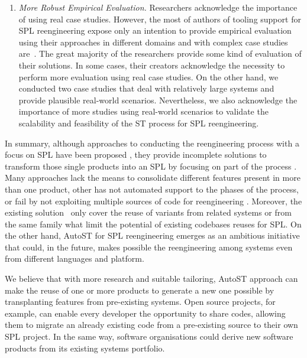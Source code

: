 \begin{enumerate}
    \item \emph{More Robust Empirical Evaluation.} Researchers acknowledge the importance of using real case studies. However, the most of authors of tooling support for SPL reengineering expose only an intention to provide empirical evaluation using their approaches in different domains and with complex case studies are~\cite{Assuncao2017}. The great majority of the researchers provide some kind of evaluation of their solutions. In some cases, their creators acknowledge the necessity to perform more evaluation using real case studies. On the other hand, we conducted two case studies that deal with relatively large systems and provide plausible real-world scenarios. Nevertheless, we also acknowledge the importance of more studies using real-world scenarios to validate the scalability and feasibility of the ST process for SPL reengineering. 
    
\end{enumerate}
In summary, although approaches to conducting the reengineering process with a focus on SPL have been proposed \cite{Assuncao2017}, they provide incomplete solutions to transform those single products into an SPL by focusing on part of the process \cite{Assuncao2017}. Many approaches lack the means to consolidate different features present in more than one product, other has not automated support to the phases of the process, or fail by not exploiting multiple sources of code for reengineering \cite{Assuncao2017}. Moreover, the existing solution~\cite{Fischer2015} only cover the reuse of variants from related systems or from the same family what limit the potential of existing codebases reuses for SPL. On the other hand, AutoST for SPL reengineering emerges as an ambitious initiative that could, in the future, makes possible the reengineering among systems even from different languages and platform. 

We believe that with more research and suitable tailoring, AutoST approach can make the reuse of one or more products to generate a new one possible by transplanting features from pre-existing systems. Open source projects, for example, can enable every developer the opportunity to share codes, allowing them to migrate an already existing code from a pre-existing source to their own SPL project. In the same way, software organisations could derive new software products from its existing systems portfolio.
